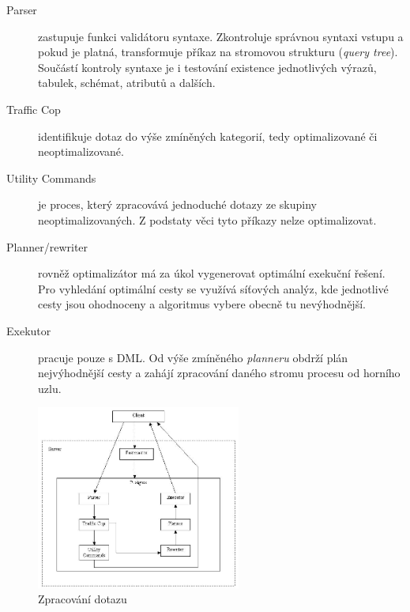 \documentclass[a4paper,12pt,oneside]{report}
\begin{document}
\begin{description}
\item[Parser]zastupuje funkci validátoru syntaxe. Zkontroluje správnou
  syntaxi vstupu a pokud je platná, transformuje příkaz na stromovou
  strukturu (\textit{query tree}). Součástí kontroly syntaxe je i
  testování existence jednotlivých výrazů, tabulek, schémat, atributů
  a dalších.

\item[Traffic Cop] identifikuje dotaz do výše zmíněných kategorií,
  tedy optimalizované či neoptimalizované.

\item[Utility Commands] je proces, který zpracovává jednoduché dotazy
  ze skupiny neoptimalizovaných. Z podstaty věci tyto příkazy nelze
  optimalizovat.

\item[Planner/rewriter] rovněž optimalizátor má za úkol vygenerovat
  optimální exekuční řešení. Pro vyhledání optimální cesty se využívá
  síťových analýz, kde jednotlivé cesty jsou ohodnoceny a algoritmus
  vybere obecně tu nevýhodnější.

\item[Exekutor] pracuje pouze s  \acs{DML}.  Od výše zmíněného
  \textit{planneru} obdrží plán nejvýhodnější cesty a zahájí zpracování daného stromu procesu od horního uzlu.
\end{description}


  
\begin{figure}[h!]
    \centering
    \includegraphics[width=0.6\textwidth]{./img/implementace/postgremodel1.jpg}
    \caption[Dotaz PostgreSQL]{\centering  Zpracování dotazu \footnotemark}
 \end{figure} 
   \label{tab:dotaz}
\end{document}
